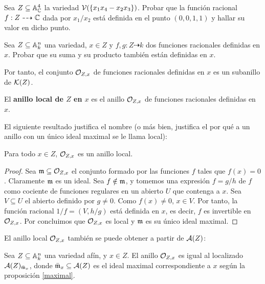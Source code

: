 \documentclass[ACGA.tex]{subfiles}
\begin{document}
\begin{ejer}
 Sea $Z\subseteq \mathbb{A}^4_{\mathbb{C}}$ la variedad $\mathcal{V}(\{x_1x_4-x_2x_3\})$. Probar que la función racional $f:Z\dashrightarrow \mathbb{C}$ dada por $x_1/x_2$ está definida en el punto $(0,0,1,1)$ y hallar su valor en dicho punto.
\end{ejer}

\begin{ejer}\label{sumaproddefinida}
 Sea $Z\subseteq\mathbb{A}^n_k$ una variedad, $x\in Z$ y $f,g:Z\dashrightarrow k$ dos funciones racionales definidas en $x$. Probar que su suma y su producto también están definidas en $x$.
\end{ejer}

Por tanto, el conjunto ${\mathcal O}_{Z,x}$ de funciones racionales definidas en $x$ es un subanillo de ${\mathcal K}(Z)$.

\begin{defi}
 El {\bf anillo local de $Z$ en $x$} es el anillo ${\mathcal O}_{Z,x}$ de funciones racionales definidas en $x$.
\end{defi}

El siguiente resultado justifica el nombre (o más bien, justifica el por qué a un anillo con un único ideal maximal se le llama local):

\begin{prop}
 Para todo $x\in Z$, ${\mathcal O}_{Z,x}$ es un anillo local.
\end{prop}

\begin{proof}
 Sea ${\mathfrak{m}}\subseteq{\mathcal O}_{Z,x}$ el conjunto formado por las funciones $f$ tales que $f(x)=0$. Claramente ${\mathfrak{m}}$ es un ideal. Sea $f\notin{\mathfrak{m}}$, y tomemos una expresión $f=g/h$ de $f$ como cociente de funciones regulares en un abierto $U$ que contenga a $x$. Sea $V\subseteq U$ el abierto definido por $g\neq 0$. Como $f(x)\neq 0$, $x\in V$. Por tanto, la función racional $1/f=(V,h/g)$ está definida en $x$, es decir, $f$ es invertible en ${\mathcal O}_{Z,x}$. Por \cite[proposición 1.6]{am} concluimos que ${\mathcal O}_{Z,x}$ es local y ${\mathfrak{m}}$ es su único ideal maximal.
\end{proof}

El anillo local ${\mathcal O}_{Z,x}$ también se puede obtener a partir de $\mathcal{A}(Z)$:

\begin{prop}\label{anillolocal}
 Sea $Z\subseteq\mathbb{A}^n_k$ una variedad afín, y $x\in Z$. El anillo ${\mathcal O}_{Z,x}$ es igual al localizado $\mathcal{A}(Z)_{\bar{{\mathfrak{m}}}_x}$, donde $\bar{{\mathfrak{m}}}_x\subseteq\mathcal{A}(Z)$ es el ideal maximal correspondiente a $x$ según la proposición \ref{maximal}.
\end{prop}
\end{document}
